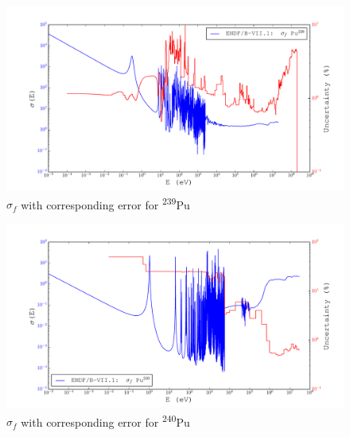 \documentclass[11pt,notitlepage]{article}
\newcommand{\tss}{\textsuperscript}
\begin{document}
\begin{todolist}
  \begin{figure}[H]
    \begin{center}
      \includegraphics[width=0.9\columnwidth]{../Weighting/X_Sections/XwVar_Pu_239_94_f.pdf}
      \vspace{-5mm}
      \caption{$\sigma_f$ with corresponding error for \tss{239}Pu}
      \label{fig:XPu239}
    \end{center}
  \end{figure}

    \begin{figure}[H]
    \begin{center}
      \includegraphics[width=0.9\columnwidth]{../Weighting/X_Sections/XwVar_Pu_240_94_f.pdf}
      \vspace{-5mm}
      \caption{$\sigma_f$ with corresponding error for \tss{240}Pu}
      \label{fig:XPu240}
    \end{center}
  \end{figure}


\end{todolist}
\end{document}
